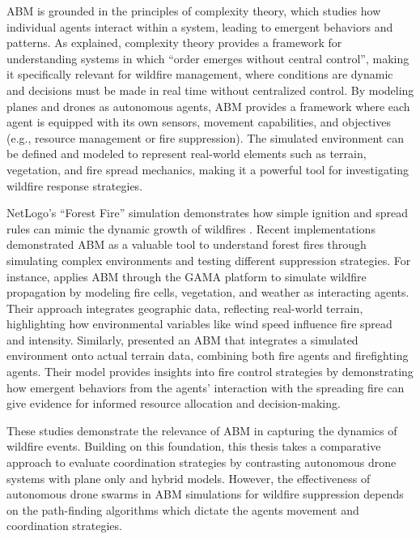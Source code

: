 \documentclass[11pt, a4paper]{article}
\begin{document}
ABM is grounded in the principles of complexity theory, which studies how individual agents interact within a system, leading to emergent behaviors and patterns. As \citet*{wilensky2015introduction} explained, complexity theory provides a framework for understanding systems in which ``order emerges without central control'', making it specifically relevant for wildfire management, where conditions are dynamic and decisions must be made in real time without centralized control. By modeling planes and drones as autonomous agents, ABM provides a framework where each agent is equipped with its own sensors, movement capabilities, and objectives (e.g., resource management or fire suppression). The simulated environment can be defined and modeled to represent real-world elements such as terrain, vegetation, and fire spread mechanics, making it a powerful tool for investigating wildfire response strategies.

NetLogo's ``Forest Fire'' simulation demonstrates how simple ignition and spread rules can mimic the dynamic growth of wildfires \citep{wilensky2015introduction}. Recent implementations demonstrated ABM as a valuable tool to understand forest fires through simulating complex environments and testing different suppression strategies. For instance, \citet*{MorenoEspino2025} applies ABM through the GAMA platform \citep{Gamma} to simulate wildfire propagation by modeling fire cells, vegetation, and weather as interacting agents. Their approach integrates geographic data, reflecting real-world terrain, highlighting how environmental variables like wind speed influence fire spread and intensity. Similarly, \citet*{Dorrer_2020} presented an ABM that integrates a simulated environment onto actual terrain data, combining both fire agents and firefighting agents. Their model provides insights into fire control strategies by demonstrating how emergent behaviors from the agents' interaction with the spreading fire can give evidence for informed resource allocation and decision-making.

These studies demonstrate the relevance of ABM in capturing the dynamics of wildfire events. Building on this foundation, this thesis takes a comparative approach to evaluate coordination strategies by contrasting autonomous drone systems with plane only and hybrid models. However, the effectiveness of autonomous drone swarms in ABM simulations for wildfire suppression depends on the path-finding algorithms which dictate the agents movement and coordination strategies.
\end{document}
